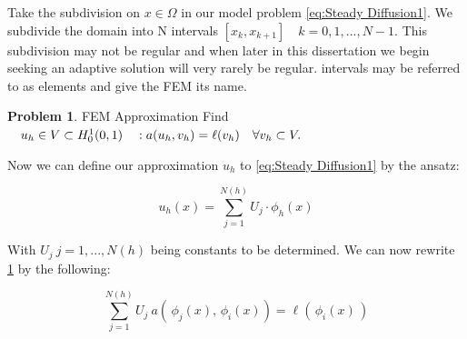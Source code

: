 \documentclass{uonmathreport}
\theoremstyle{definition}
\theoremstyle{problem}
\newtheorem{problem}{Problem}[section]
\theoremstyle{theorem}
\begin{document}
Take the subdivision on $x \in \Omega$ in our model problem \ref{eq:Steady Diffusion1}. We subdivide the domain into N intervals $[x_k, x_{k+1}] \quad k=0, 1, ... , N-1$. This subdivision may not be regular and when later in this dissertation we begin seeking an adaptive solution will very rarely be regular. intervals may be referred to as elements and give the FEM its name.
\\
\begin{center}
\end{center}


\vspace{5mm} %

\begin{problem}{FEM Approximation} \label{prob:Approx1}
Find $\quad u_h \in  V\subset H^1_0(0, 1) \quad : \\ a(u_h, v_h) =  \ell(v_h) \quad \forall v_h \subset V.$
\end{problem}

Now we can define our approximation $u_h$ to \ref{eq:Steady Diffusion1} by the ansatz:

\begin{equation} 
u_h(x) = \sum_{j=1}^{N(h)} U_j \cdot \phi_h(x) \label{eq:ansatz}
\end{equation}

With $U_j \: j = 1, ..., N(h)$ being constants to be determined. We can now rewrite \ref{prob:Approx1} by the following:

\begin{equation*}
\sum_{j=1}^{N(h)}U_j \: a( \,\phi_j(x),\, \phi_i(x)) = \ell(\,\phi_i(x)\,) 
\end{equation*}
\end{document}
